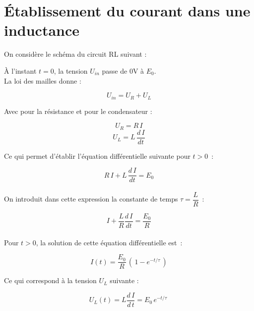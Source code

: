 \section{Établissement du courant dans une inductance}

On considère le schéma du circuit RL suivant :

\begin{center}

\end{center}

À l'instant $t=0$, la tension $U_{in}$ passe de 0V à $E_0$. \\

La loi des mailles donne :

$$U_{in} = U_R + U_L $$

Avec pour la résistance et pour le condensateur :

$$U_R = R\,I$$
$$ U_L = L \, \dfrac{d\,I}{dt} $$

Ce qui permet d'établir l'équation différentielle suivante pour $t>0$~:

$$ R\,I + L\,\dfrac{d\,I}{dt}   = E_0 $$ \\

On introduit dans cette expression la constante de temps $\tau = \dfrac{L}{R}$~:

$$ I + \dfrac{L}{R}\dfrac{d\,I}{dt}   = \dfrac{E_0}{R} $$ \\

Pour $t>0$, la solution de cette équation différentielle est~:

$$ I(t) = \dfrac{E_0}{R}\,(\,1 - e^{-t/\tau}\,) $$

Ce qui correspond à la tension $U_L$ suivante :

$$ U_L(t) = L \dfrac{d\,I}{d\,t} = E_0 \, e^{-t/\tau}\ $$


